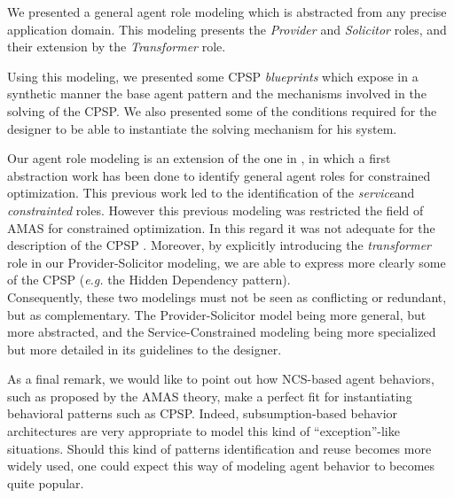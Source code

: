 We presented a general agent role modeling which is abstracted from any precise application domain. This modeling presents the \emph{Provider} and \emph{Solicitor} roles, and their extension by the \emph{Transformer} role.

Using this modeling, we presented some CPSP \emph{blueprints} which expose in a synthetic manner the base agent pattern and the mechanisms involved in the solving of the CPSP. We also presented some of the conditions required for the designer to be able to instantiate the solving mechanism for his system.

Our agent role modeling is an extension of the one in \cite{Ka2011.6}, in which a first abstraction work has been done to identify general agent roles for constrained optimization. This previous work led to the identification of the \emph{service}and \emph{constrainted} roles. However this previous modeling was restricted the field of AMAS for constrained optimization. In this regard it was not adequate for the description of the CPSP . Moreover, by explicitly introducing the \emph{transformer} role in our Provider-Solicitor modeling, we are able to express more clearly some of the CPSP (\emph{e.g.} the Hidden Dependency pattern).\\
Consequently, these two modelings must not be seen as conflicting or redundant, but as complementary. The Provider-Solicitor model being more general, but more abstracted, and the Service-Constrained modeling being more specialized but more detailed in its guidelines to the designer.

As a final remark, we would like to point out how NCS-based agent behaviors, such as proposed by the AMAS theory, make a perfect fit for instantiating behavioral patterns such as CPSP. Indeed, subsumption-based behavior architectures are very appropriate to model this kind of \enquote{exception}-like situations. Should this kind of patterns identification and reuse becomes more widely used, one could expect this way of modeling agent behavior to becomes quite popular.
